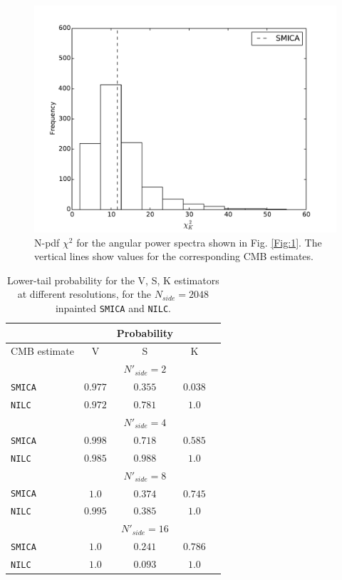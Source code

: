 \begin{figure}
\includegraphics[scale=0.3]{figures/chapter-vsk/kchi2.pdf}
\caption{N-pdf $\chi^ 2$ for the angular power spectra shown in Fig. \ref{Fig:1}. The vertical lines show values for the corresponding CMB estimates.}
\label{Fig:2}
\end{figure}

\begin{table}
\centering
\caption{Lower-tail probability for the V, S, K estimators at different resolutions, for the $N_{side} = 2048$ inpainted \texttt{SMICA} and \texttt{NILC}.}
\label{table:1}
\begin{tabular}{@{}lcccc}
\hline 
  & & Probability & \\
\hline  
CMB estimate & V & S & K \\ 
\hline  
 & & $N'_{side}=2$ & \\
\texttt{SMICA} & $0.977$ & $0.355$ & $0.038$ \\ 
\texttt{NILC} & $0.972$ & $0.781$ & $1.0$  \\
 & & $ N'_{side} = 4 $ & \\
\texttt{SMICA} & $0.998$ & $0.718$ & $0.585$ \\
\texttt{NILC} & $0.985$ & $0.988$ & $1.0$ \\
 & & $N'_{side} = 8$ & \\
 \texttt{SMICA} & $1.0$ & $0.374$ & $0.745$ \\
 \texttt{NILC} & $0.995$ & $0.385$ & $1.0$ \\
 & & $N'_{side} = 16$ & \\
 \texttt{SMICA} & $1.0$ & $0.241$ & $0.786$ \\
 \texttt{NILC} & $1.0$ & $0.093$ & $1.0$ \\
\end{tabular} 
\end{table}

